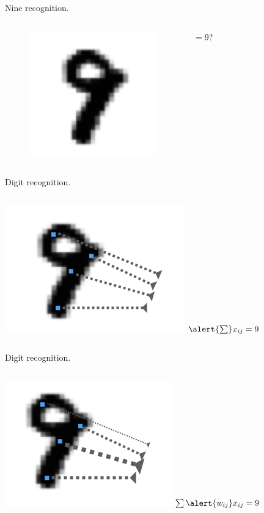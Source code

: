 \documentclass[10pt]{beamer}
\begin{document}
\begin{frame}[fragile]{Nine recognition.}
\begin{columns}
\begin{figure}
    \centering
    \includegraphics[scale=0.5]{images/nine_only.png} 
\end{figure}
\centering
 $= 9$?
\end{columns}
\end{frame}


\begin{frame}[fragile]{Digit recognition.}
\begin{columns}
\centering
\includegraphics[scale=0.5]{images/nine_x.png} 
\centering
 $\alert{\sum} x_{ij} = 9$
\end{columns}
\end{frame}

\begin{frame}[fragile]{Digit recognition.}
\begin{columns}
\centering
\includegraphics[scale=0.5]{images/nine_wx.png} 
\centering
 $\sum \alert{w_{ij}} x_{ij} = 9$
\end{columns}
\end{frame}
\end{document}

